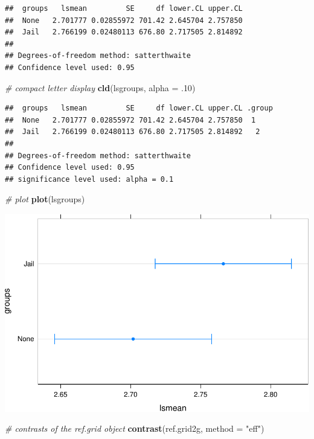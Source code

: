 \documentclass[]{article}
\newenvironment{Shaded}{\begin{snugshade}}{\end{snugshade}}
\newcommand{\KeywordTok}[1]{\textcolor[rgb]{0.13,0.29,0.53}{\textbf{{#1}}}}
\newcommand{\DataTypeTok}[1]{\textcolor[rgb]{0.13,0.29,0.53}{{#1}}}
\newcommand{\DecValTok}[1]{\textcolor[rgb]{0.00,0.00,0.81}{{#1}}}
\newcommand{\StringTok}[1]{\textcolor[rgb]{0.31,0.60,0.02}{{#1}}}
\newcommand{\CommentTok}[1]{\textcolor[rgb]{0.56,0.35,0.01}{\textit{{#1}}}}
\newcommand{\NormalTok}[1]{{#1}}
\begin{document}
\begin{verbatim}
##  groups   lsmean         SE     df lower.CL upper.CL
##  None   2.701777 0.02855972 701.42 2.645704 2.757850
##  Jail   2.766199 0.02480113 676.80 2.717505 2.814892
## 
## Degrees-of-freedom method: satterthwaite 
## Confidence level used: 0.95
\end{verbatim}

\begin{Shaded}
\begin{Highlighting}[]
\CommentTok{# compact letter display}
\KeywordTok{cld}\NormalTok{(lsgroups, }\DataTypeTok{alpha =} \NormalTok{.}\DecValTok{10}\NormalTok{)}
\end{Highlighting}
\end{Shaded}

\begin{verbatim}
##  groups   lsmean         SE     df lower.CL upper.CL .group
##  None   2.701777 0.02855972 701.42 2.645704 2.757850  1    
##  Jail   2.766199 0.02480113 676.80 2.717505 2.814892   2   
## 
## Degrees-of-freedom method: satterthwaite 
## Confidence level used: 0.95 
## significance level used: alpha = 0.1
\end{verbatim}

\begin{Shaded}
\begin{Highlighting}[]
\CommentTok{# plot}
\KeywordTok{plot}\NormalTok{(lsgroups)}
\end{Highlighting}
\end{Shaded}

\includegraphics{Conditional_Models_doc_files/figure-latex/unnamed-chunk-37-1.pdf}

\begin{Shaded}
\begin{Highlighting}[]
\CommentTok{# contrasts of the ref.grid object}
\KeywordTok{contrast}\NormalTok{(ref.grid2g, }\DataTypeTok{method =} \StringTok{"eff"}\NormalTok{)}
\end{Highlighting}
\end{Shaded}
\end{document}
